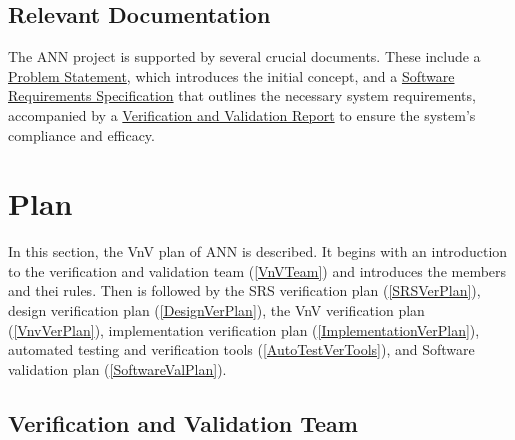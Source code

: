 \documentclass[12pt, titlepage]{article}
\begin{document}
\subsection{Relevant Documentation}

The ANN project is supported by several crucial documents. 
These include a \href{https://github.com/tanya-jp/ANN-CAS741/blob/main/docs/ProblemStatementAndGoals/ProblemStatement.pdf}
{Problem Statement}, which introduces the initial concept, and a 
\href{https://github.com/tanya-jp/ANN-CAS741/blob/main/docs/SRS/SRS.pdf}{Software 
Requirements Specification} that outlines the necessary system requirements, accompanied 
by a \href{https://github.com/tanya-jp/ANN-CAS741/blob/main/docs/VnVReport/VnVReport.pdf}
{Verification and Validation Report} to ensure the system's compliance and efficacy.




\section{Plan}\label{Plan}

In this section, the VnV plan of ANN is described. 
It begins with an introduction to the verification and validation team (\autoref{VnVTeam}) and 
introduces the members and thei rules. 
Then is followed by the SRS verification plan (\autoref{SRSVerPlan}), 
design verification plan (\autoref{DesignVerPlan}), 
the VnV verification plan (\autoref{VnvVerPlan}), 
implementation verification plan (\autoref{ImplementationVerPlan}), 
automated testing and verification tools (\autoref{AutoTestVerTools}), and
Software validation plan (\autoref{SoftwareValPlan}).


\subsection{Verification and Validation Team}\label{VnVTeam}
\end{document}
